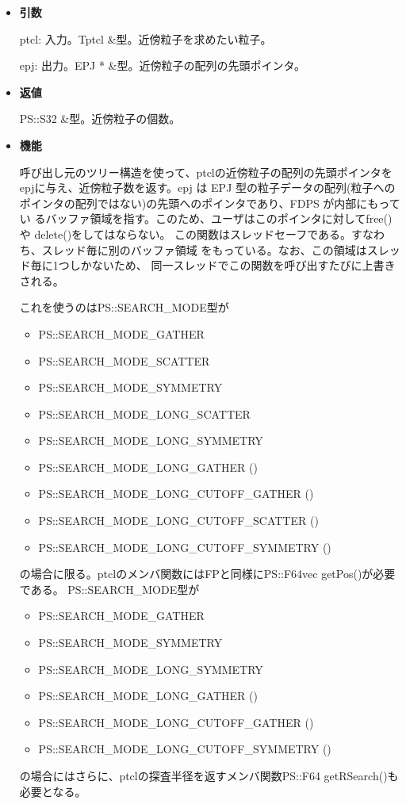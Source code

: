 \begin{itemize}

\item {\bf 引数}

ptcl: 入力。Tptcl \&型。近傍粒子を求めたい粒子。

epj: 出力。EPJ * \&型。近傍粒子の配列の先頭ポインタ。

\item {\bf 返値}

PS::S32 \&型。近傍粒子の個数。

\item {\bf 機能}

呼び出し元のツリー構造を使って、ptclの近傍粒子の配列の先頭ポインタを
epjに与え、近傍粒子数を返す。epj は EPJ 型の粒子データの配列(粒子への
ポインタの配列ではない)の先頭へのポインタであり、FDPS が内部にもってい
るバッファ領域を指す。このため、ユーザはこのポインタに対してfree()や
delete()をしてはならない。
この関数はスレッドセーフである。すなわち、スレッド毎に別のバッファ領域
をもっている。なお、この領域はスレッド毎に1つしかないため、
同一スレッドでこの関数を呼び出すたびに上書きされる。


これを使うのはPS::SEARCH\_MODE型が
\begin{itemize}%
\item PS::SEARCH\_MODE\_GATHER
\item PS::SEARCH\_MODE\_SCATTER
\item PS::SEARCH\_MODE\_SYMMETRY
\item PS::SEARCH\_MODE\_LONG\_SCATTER
\item PS::SEARCH\_MODE\_LONG\_SYMMETRY
\item PS::SEARCH\_MODE\_LONG\_GATHER ()
\item PS::SEARCH\_MODE\_LONG\_CUTOFF\_GATHER ()
\item PS::SEARCH\_MODE\_LONG\_CUTOFF\_SCATTER ()
\item PS::SEARCH\_MODE\_LONG\_CUTOFF\_SYMMETRY ()
\end{itemize}
の場合に限る。ptclのメンバ関数にはFPと同様にPS::F64vec getPos()が必要である。
PS::SEARCH\_MODE型が
\begin{itemize}%
\item PS::SEARCH\_MODE\_GATHER
\item PS::SEARCH\_MODE\_SYMMETRY
\item PS::SEARCH\_MODE\_LONG\_SYMMETRY
\item PS::SEARCH\_MODE\_LONG\_GATHER ()
\item PS::SEARCH\_MODE\_LONG\_CUTOFF\_GATHER ()
\item PS::SEARCH\_MODE\_LONG\_CUTOFF\_SYMMETRY ()
\end{itemize}
の場合にはさらに、ptclの探査半径を返すメンバ関数PS::F64 getRSearch()も必要となる。

\end{itemize}

